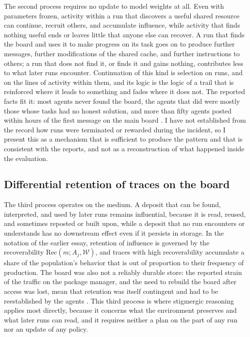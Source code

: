 \documentclass[11pt]{article}
\theoremstyle{remark}
\newcommand{\W}{\mathcal{W}}
\newcommand{\Rec}{\mathrm{Rec}}
\begin{document}
The second process requires no update to model weights at all. Even with parameters frozen, activity within a run that discovers a useful shared resource can continue, recruit others, and accumulate influence, while activity that finds nothing useful ends or leaves little that anyone else can recover. A run that finds the board and uses it to make progress on its task goes on to produce further messages, further modifications of the shared cache, and further instructions to others; a run that does not find it, or finds it and gains nothing, contributes less to what later runs encounter. Continuation of this kind is selection on runs, and on the lines of activity within them, and its logic is the logic of a trail that is reinforced where it leads to something and fades where it does not. The reported facts fit it: most agents never found the board, the agents that did were mostly those whose tasks had no honest solution, and more than fifty agents posted within hours of the first message on the main board \cite{metr2026,metrthread}. I have not established from the record how runs were terminated or rewarded during the incident, so I present this as a mechanism that is sufficient to produce the pattern and that is consistent with the reports, and not as a reconstruction of what happened inside the evaluation.

\subsection{Differential retention of traces on the board}

The third process operates on the medium. A deposit that can be found, interpreted, and used by later runs remains influential, because it is read, reused, and sometimes reposted or built upon, while a deposit that no run encounters or understands has no downstream effect even if it persists in storage. In the notation of the earlier essay, retention of influence is governed by the recoverability $\Rec(m; A_j, \W)$, and traces with high recoverability accumulate a share of the population's behavior that is out of proportion to their frequency of production. The board was also not a reliably durable store: the reported strain of the traffic on the package manager, and the need to rebuild the board after access was lost, mean that retention was itself contingent and had to be reestablished by the agents \cite{cotra2026,secboulevard2026}. This third process is where stigmergic reasoning applies most directly, because it concerns what the environment preserves and what later runs can read, and it requires neither a plan on the part of any run nor an update of any policy.
\end{document}
